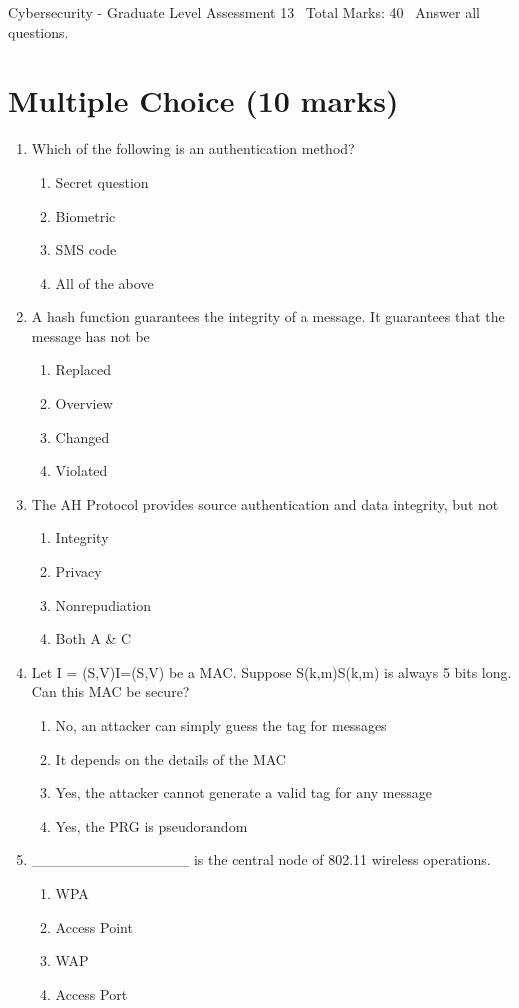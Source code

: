 \documentclass[12pt]{article}
\begin{document}
\begin{center}
Cybersecurity - Graduate Level Assessment 13 \
Total Marks: 40 \
Answer all questions.
\end{center}

\section*{Multiple Choice (10 marks)}
\begin{enumerate}[label=\arabic*.]
\item Which of the following is an authentication method?
\begin{enumerate}[label=(\alph*)]
    \item Secret question
    \item Biometric
    \item SMS code
    \item All of the above
\end{enumerate}
\item A hash function guarantees the integrity of a message. It guarantees that the message has not be
\begin{enumerate}[label=(\alph*)]
    \item Replaced
    \item Overview
    \item Changed
    \item Violated
\end{enumerate}
\item The AH Protocol provides source authentication and data integrity, but not
\begin{enumerate}[label=(\alph*)]
    \item Integrity
    \item Privacy
    \item Nonrepudiation
    \item Both A \& C
\end{enumerate}
\item Let I = (S,V)I=(S,V) be a MAC. Suppose S(k,m)S(k,m) is always 5 bits long. Can this MAC be secure?
\begin{enumerate}[label=(\alph*)]
    \item No, an attacker can simply guess the tag for messages
    \item It depends on the details of the MAC
    \item Yes, the attacker cannot generate a valid tag for any message
    \item Yes, the PRG is pseudorandom
\end{enumerate}
\item \_\_\_\_\_\_\_\_\_\_\_\_\_\_\_ is the central node of 802.11 wireless operations.
\begin{enumerate}[label=(\alph*)]
    \item WPA
    \item Access Point
    \item WAP
    \item Access Port
\end{enumerate}
\end{enumerate}
\end{document}

